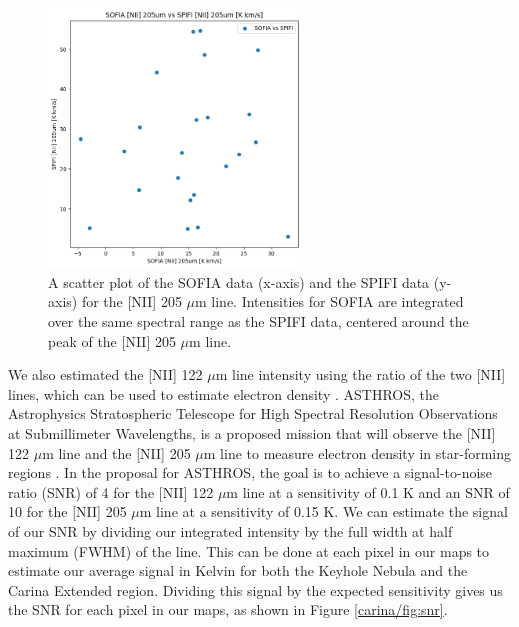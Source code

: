 \begin{figure}
    \centering
    \includegraphics[width=0.6\textwidth]{figs/carina/oberst.png}
    \caption[Scatter Plot of SPIFI and SOFIA {[NII]} 205 $\mu$m Line Intensities]{
        A scatter plot of the SOFIA data (x-axis) and the SPIFI data (y-axis) for the [NII] 205 $\mu$m line.
        Intensities for SOFIA are integrated over the same spectral range as the SPIFI data, centered around the peak of the [NII] 205 $\mu$m line.
        }
    \label{carina/fig:oberst}
\end{figure}

We also estimated the [NII] 122 $\mu$m line intensity using the ratio of the two [NII] lines, which can be used to estimate electron density \parencite{goldsmith2015herschel}.
ASTHROS, the Astrophysics Stratospheric Telescope for High Spectral Resolution Observations at Submillimeter Wavelengths, is a proposed mission that will observe the [NII] 122 $\mu$m line and the [NII] 205 $\mu$m line to measure electron density in star-forming regions \parencite{siles2020asthros}.
In the proposal for ASTHROS, the goal is to achieve a signal-to-noise ratio (SNR) of 4 for the [NII] 122 $\mu$m line at a sensitivity of 0.1 K and an SNR of 10 for the [NII] 205 $\mu$m line at a sensitivity of 0.15 K.
We can estimate the signal of our SNR by dividing our integrated intensity by the full width at half maximum (FWHM) of the line.
This can be done at each pixel in our maps to estimate our average signal in Kelvin for both the Keyhole Nebula and the Carina Extended region.
Dividing this signal by the expected sensitivity gives us the SNR for each pixel in our maps, as shown in Figure \ref{carina/fig:snr}.

